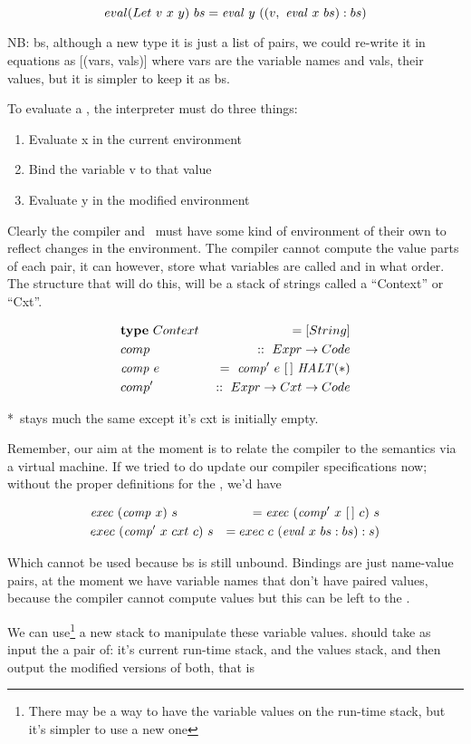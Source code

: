 \documentclass {article}
\begin{document}
\[eval(Let\ v\ x\ y)\ bs 
		= \mathit{eval\ }  y\ ((v,\ \mathit{eval\ }  x\ bs):bs) \]

NB: bs, although a new type it is just a list
of pairs, we could re-write it in equations as
[(vars, vals)] where vars are the variable names
and vals, their values,
but it is simpler to keep it as bs.

To evaluate a , the interpreter
must do three things:
\begin{enumerate}
	\item Evaluate x in the current environment
	\item Bind the variable v to that value
	\item Evaluate y in the modified environment
\end{enumerate}

Clearly the compiler and \vm\ must have some kind of
environment of their own to
reflect changes in the environment.
The compiler cannot compute the value
parts of each pair,
it can however, 
store what variables are called and in what order.
The structure that will do this, will be a 
stack of strings called a ``Context'' or ``Cxt''.

\begin{eqnarray*}
	&\textbf{type}\  Context\ &= [String] \\
	&comp &::\ Expr \rightarrow Code \\
	&\mathit{comp\ } e &=\ \mathit{comp'\ }  e\ [\,]\ \mathit{HALT} (*)\\
	&comp' &::\ Expr \rightarrow Cxt \rightarrow Code
\end{eqnarray*}

*\comp\ stays much the same except it's cxt
	is initially empty.

Remember, our aim at the moment
is to relate the compiler to the
semantics via a virtual machine.
If we tried to do update our compiler 
specifications now; 
without the proper definitions
for the \vm, we'd have

\begin{eqnarray*}
&\mathit{exec\ } (\mathit{comp\ } x)\ s  
	&= \mathit{exec\ } (\mathit{comp'\ }  x\ [\,]\ c)\ s  \\
&exec\ (\mathit{comp'\ }  x\ cxt\ c)\ s  
	&= exec\ c\ (\mathit{eval\ }  x\ bs :bs):s)
\end{eqnarray*}

Which cannot be used
because bs is still unbound.
Bindings are just name-value pairs,
at the moment we have variable names
that don't have paired values,
because the compiler cannot compute values
but this can be left to the \vm.

We can use\footnote{
There may be a way to have the variable values
on the run-time stack, but it's
simpler to use a new one}
a new stack to
manipulate these variable values.
\exec should take as input
the a pair of:
it's current run-time stack,
and the values stack,
and then output the modified versions of both,
that is
\end{document}
